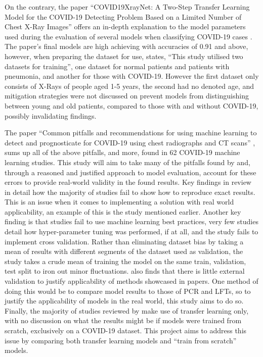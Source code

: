 On the contrary, the paper “COVID19XrayNet: A Two-Step Transfer Learning Model for the COVID-19 Detecting Problem Based on a Limited Number of Chest X-Ray Images” offers an in-depth explanation to the model parameters used during the evaluation of several models when classifying COVID-19 cases \citep{zhang2020covid19xraynet}. The paper’s final models are high achieving with accuracies of 0.91 and above, however, when preparing the dataset for use, \cite{zhang2020covid19xraynet} states, “This study utilised two datasets for training”, one dataset for normal patients and patients with pneumonia, and another for those with COVID-19. However the first dataset only consists of X-Rays of people aged 1-5 years, the second had no denoted age, and mitigation strategies were not discussed on prevent models from distinguishing between young and old patients, compared to those with and without COVID-19, possibly invalidating findings.

The paper “Common pitfalls and recommendations for using machine learning to detect and prognosticate for COVID-19 using chest radiographs and CT scans” \citep{roberts2021common}, sums up all of the above pitfalls, and more, found in 62 COVID-19 machine learning studies. This study will aim to take many of the pitfalls found by \cite{roberts2021common} and, through a reasoned and justified approach to model evaluation, account for these errors to provide real-world validity in the found results. Key findings in \cite{roberts2021common} review in detail how the majority of studies fail to show how to reproduce exact results. This is an issue when it comes to implementing a solution with real world applicability, an example of this is the \cite{bressem2020comparing} study mentioned earlier. Another key finding is that studies fail to use machine learning best practices, very few studies detail how hyper-parameter tuning was performed, if at all, and the \cite{bressem2020comparing} study fails to implement cross validation. Rather than eliminating dataset bias by taking a mean of results with different segments of the dataset used as validation, the study takes a crude mean of training the model on the same train, validation, test split to iron out minor fluctuations. \cite{roberts2021common} also finds that there is little external validation to justify applicability of methods showcased in papers. One method of doing this would be to compare model results to those of PCR and LFTs, so to justify the applicability of models in the real world, this study aims to do so. Finally, the majority of studies reviewed by \cite{roberts2021common} make use of transfer learning only, with no discussion on what the results might be if models were trained from scratch, exclusively on a COVID-19 dataset. This project aims to address this issue by comparing both transfer learning models and “train from scratch” models.

